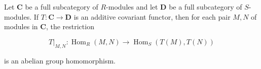 Let $\mathbf{C}$ be a full subcategory of $R$-modules and let $\mathbf{D}$ be a full subcategory of $S$-modules. If $T: \mathbf{C} \to \mathbf{D}$ is an additive covariant functor, then for each pair $M, N$ of modules in $\mathbf{C}$, the restriction

$$T|_{M,N}: \operatorname{Hom}_R(M, N) \longrightarrow \operatorname{Hom}_S(T(M), T(N))$$

is an abelian group homomorphism.
